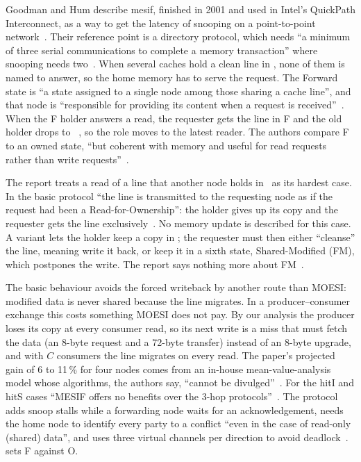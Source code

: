 Goodman and Hum describe \gls{mesif}, finished in 2001 and used in Intel's
QuickPath Interconnect, as a way to get the latency of snooping on a point-to-point
network~\cite[\S1]{goodman2009mesif}. Their reference point is a directory
protocol, which needs ``a minimum of three serial communications to complete a
memory transaction'' where snooping needs two~\cite[\S1]{goodman2009mesif}. When
several caches hold a clean line in \stS, none of them is named to answer, so the
home memory has to serve the request. The Forward state is ``a state assigned to a
single node among those sharing a cache line'', and that node is ``responsible for
providing its content when a request is received''~\cite[\S2.1]{goodman2009mesif}.
When the F holder answers a read, the requester gets the line in F and the old
holder drops to \stS~\cite[\S2.1.1, case ii]{goodman2009mesif}, so the role moves to
the latest reader. The authors compare F to an owned state, ``but coherent with
memory and useful for read requests rather than write
requests''~\cite[\S2.1]{goodman2009mesif}.

The report treats a read of a line that another node holds in \stM\ as its hardest
case. In the basic protocol ``the line is transmitted to the requesting node as if
the request had been a Read-for-Ownership'': the holder gives up its copy and the
requester gets the line exclusively~\cite[\S2.1.1, case iv]{goodman2009mesif}. No
memory update is described for this case. A variant lets the holder keep a copy in
\stS; the requester must then either ``cleanse'' the line, meaning write it back,
or keep it in a sixth state, Shared-Modified (FM), which postpones the write. The
report says nothing more about FM~\cite[\S2.1.1, case iv]{goodman2009mesif}.

The basic behaviour avoids the forced writeback by another route than MOESI:
modified data is never shared because the line migrates. In a producer--consumer
exchange this costs something MOESI does not pay. By our analysis the producer
loses its copy at every consumer read, so its next write is a miss that must fetch
the data (an 8-byte request and a 72-byte transfer) instead of an 8-byte upgrade,
and with $C$ consumers the line migrates on every read. The paper's projected gain
of 6 to 11\,\% for four nodes comes from an in-house mean-value-analysis model whose
algorithms, the authors say, ``cannot be divulged''~\cite[\S3]{goodman2009mesif}.
For the hitI and hitS cases ``MESIF offers no benefits over the 3-hop
protocols''~\cite[\S3]{goodman2009mesif}. The protocol adds snoop stalls while a
forwarding node waits for an acknowledgement, needs the home node to identify every
party to a conflict ``even in the case of read-only (shared) data'', and uses three
virtual channels per direction to avoid deadlock~\cite[\S2.1--2.3]{goodman2009mesif}.
 sets F against O.

